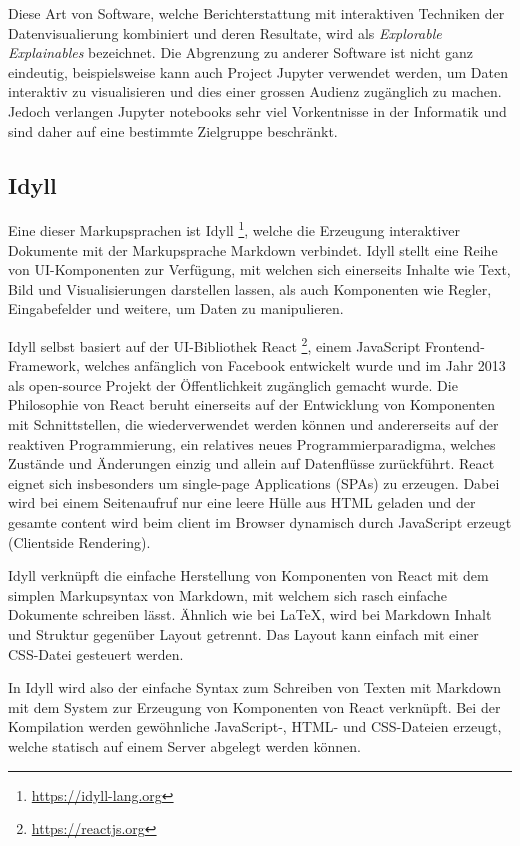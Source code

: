 \documentclass[a4paper,10.2pt,pdftex]{scrartcl}%
\begin{document}
Diese Art von Software, welche Berichterstattung mit interaktiven Techniken der Datenvisualierung kombiniert und deren Resultate, wird als \emph{Explorable Explainables} bezeichnet. Die Abgrenzung zu anderer Software ist nicht ganz eindeutig, beispielsweise kann auch Project Jupyter verwendet werden, um Daten interaktiv zu visualisieren und dies einer grossen Audienz zugänglich zu machen. Jedoch verlangen Jupyter notebooks sehr viel Vorkentnisse in der Informatik und sind daher auf eine bestimmte Zielgruppe beschränkt. 
\subsection{Idyll}
Eine dieser Markupsprachen ist Idyll \footnote{\url{https://idyll-lang.org}}, welche die Erzeugung interaktiver Dokumente mit der Markupsprache Markdown verbindet. Idyll stellt eine Reihe von UI-Komponenten zur Verfügung, mit welchen sich einerseits Inhalte wie Text, Bild und Visualisierungen darstellen lassen, als auch Komponenten wie Regler, Eingabefelder und weitere, um Daten zu manipulieren.

Idyll selbst basiert auf der UI-Bibliothek React \footnote{\url{https://reactjs.org}}, einem JavaScript Frontend-Framework, welches anfänglich von Facebook entwickelt wurde und im Jahr 2013 als open-source Projekt der Öffentlichkeit zugänglich gemacht wurde. Die Philosophie von React beruht einerseits auf der Entwicklung von Komponenten mit Schnittstellen, die wiederverwendet werden können und andererseits auf der reaktiven Programmierung, ein relatives neues Programmierparadigma, welches Zustände und Änderungen einzig und allein auf Datenflüsse zurückführt. React eignet sich insbesonders um single-page Applications (SPAs) zu erzeugen. Dabei wird bei einem Seitenaufruf nur eine leere Hülle aus HTML geladen und der gesamte content wird beim client im Browser dynamisch durch JavaScript erzeugt (Clientside Rendering).

Idyll verknüpft die einfache Herstellung von Komponenten von React mit dem simplen Markupsyntax von Markdown, mit welchem sich rasch einfache Dokumente schreiben lässt. Ähnlich wie bei LaTeX, wird bei Markdown Inhalt und Struktur gegenüber Layout getrennt. Das Layout kann einfach mit einer CSS-Datei gesteuert werden.

In Idyll wird also der einfache Syntax zum Schreiben von Texten mit Markdown mit dem System zur Erzeugung von Komponenten von React verknüpft. Bei der Kompilation werden gewöhnliche JavaScript-, HTML- und CSS-Dateien erzeugt, welche statisch auf einem Server abgelegt werden können.
\end{document}
